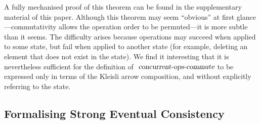 \vspace{0.35em}
\noindent
A fully mechanised proof of this theorem can be found in the supplementary material of this paper.
Although this theorem may seem ``obvious'' at first glance---commutativity allows the operation order to be permuted---it is more subtle than it seems.
The difficulty arises because operations may succeed when applied to some state, but fail when applied to another state (for example, deleting an element that does not exist in the state).
We find it interesting that it is nevertheless sufficient for the definition of $\isa{concurrent-ops-commute}$ to be expressed only in terms of the Kleisli arrow composition, and without explicitly referring to the state.

\subsection{Formalising Strong Eventual Consistency}\label{sect.abstract.sec.spec}

